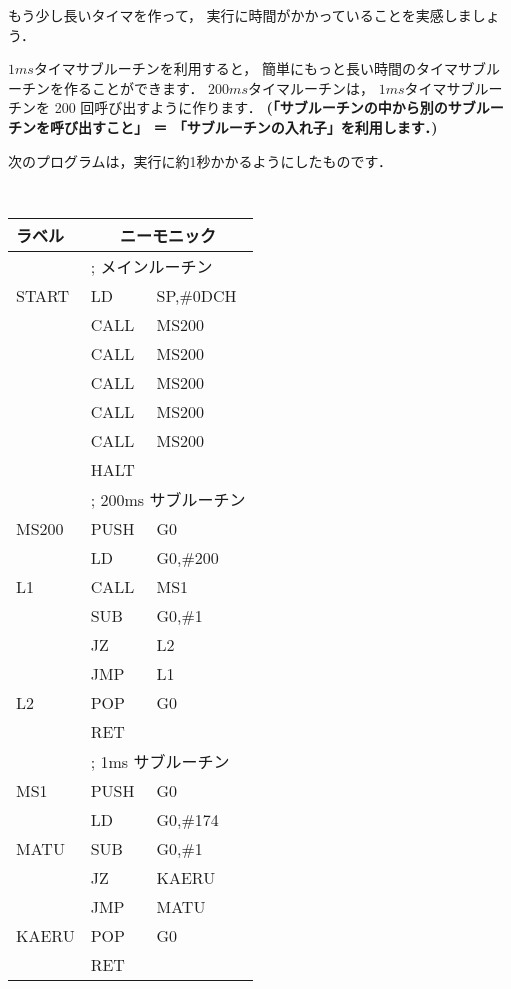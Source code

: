 もう少し長いタイマを作って，
実行に時間がかかっていることを実感しましょう．

$1ms$タイマサブルーチンを利用すると，
簡単にもっと長い時間のタイマサブルーチンを作ることができます．
$200ms$タイマルーチンは，
$1ms$タイマサブルーチンを 200 回呼び出すように作ります．
{\bf (「サブルーチンの中から別のサブルーチンを呼び出すこと」 ＝ 
「サブルーチンの入れ子」を利用します．)}

次のプログラムは，実行に約1秒かかるようにしたものです．

\begin{center}
{\footnotesize\tt
\begin{tabular}{|l|l l|} \hline
ラベル & \multicolumn{2}{|c|}{ニーモニック}        \\
\hline
      & \multicolumn{2}{|l|}{; メインルーチン}     \\
START & LD   & SP,\#0DCH                           \\
      & CALL & MS200                               \\
      & CALL & MS200                               \\
      & CALL & MS200                               \\
      & CALL & MS200                               \\
      & CALL & MS200                               \\
      & HALT &                                     \\
      & \multicolumn{2}{|l|}{; 200ms サブルーチン} \\
MS200 & PUSH & G0                                  \\
      & LD   & G0,\#200                            \\
L1    & CALL & MS1                                 \\
      & SUB  & G0,\#1                              \\
      & JZ   & L2                                  \\
      & JMP  & L1                                  \\
L2    & POP  & G0                                  \\
      & RET  &                                     \\
      & \multicolumn{2}{|l|}{; 1ms サブルーチン}   \\
MS1   & PUSH & G0                                  \\
      & LD   & G0,\#174                            \\
MATU  & SUB  & G0,\#1                              \\
      & JZ   & KAERU                               \\
      & JMP  & MATU                                \\
KAERU & POP  & G0                                  \\
      & RET  &                                     \\
\hline
\end{tabular}
}
\end{center}


